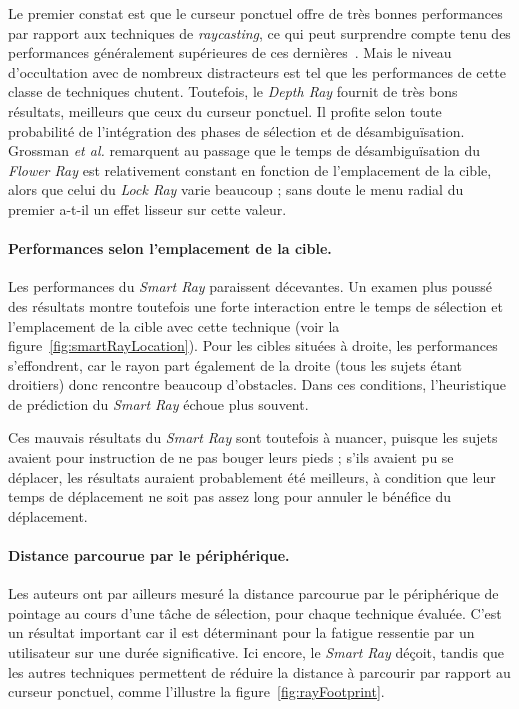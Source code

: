 	Le premier constat est que le curseur ponctuel offre de très bonnes performances par rapport aux techniques de \emph{raycasting}, ce qui peut surprendre compte tenu des performances généralement supérieures de ces dernières~\cite{bowman2001testbed}. Mais le niveau d'occultation avec de nombreux distracteurs est tel que les performances de cette classe de techniques chutent. Toutefois, le \emph{Depth Ray} fournit de très bons résultats, meilleurs que ceux du curseur ponctuel. Il profite selon toute probabilité de l'intégration des phases de sélection et de désambiguïsation. Grossman \emph{et al.} remarquent au passage que le temps de désambiguïsation du \emph{Flower Ray} est relativement constant en fonction de l'emplacement de la cible, alors que celui du \emph{Lock Ray} varie beaucoup ; sans doute le menu radial du premier a-t-il un effet lisseur sur cette valeur.

	\paragraph{Performances selon l'emplacement de la cible.}
	Les performances du \emph{Smart Ray} paraissent décevantes. Un examen plus poussé des résultats montre toutefois une forte interaction entre le temps de sélection et l'emplacement de la cible avec cette technique (voir la figure~\ref{fig:smartRayLocation}). Pour les cibles situées à droite, les performances s'effondrent, car le rayon part également de la droite (tous les sujets étant droitiers) donc rencontre beaucoup d'obstacles. Dans ces conditions, l'heuristique de prédiction du \emph{Smart Ray} échoue plus souvent.

	Ces mauvais résultats du \emph{Smart Ray} sont toutefois à nuancer, puisque les sujets avaient pour instruction de ne pas bouger leurs pieds ; s'ils avaient pu se déplacer, les résultats auraient probablement été meilleurs, à condition que leur temps de déplacement ne soit pas assez long pour annuler le bénéfice du déplacement.
	
	\paragraph{Distance parcourue par le périphérique.}
	Les auteurs ont par ailleurs mesuré la distance parcourue par le périphérique de pointage au cours d'une tâche de sélection, pour chaque technique évaluée. C'est un résultat important car il est déterminant pour la fatigue ressentie par un utilisateur sur une durée significative. Ici encore, le \emph{Smart Ray} déçoit, tandis que les autres techniques permettent de réduire la distance à parcourir par rapport au curseur ponctuel, comme l'illustre la figure~\ref{fig:rayFootprint}.
	
